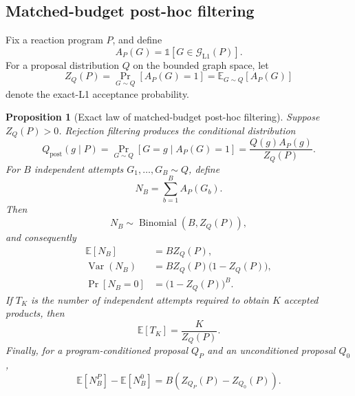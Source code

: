 \documentclass{article}
\newtheorem{proposition}[theorem]{Proposition}
\begin{document}
\subsection{Matched-budget post-hoc filtering}

Fix a reaction program $P$, and define
\begin{equation}
    A_P(G)
    =
    \mathbb{1}\!\left[
        G\in\mathcal{G}_{\mathrm{L1}}(P)
    \right].
\end{equation}
For a proposal distribution $Q$ on the bounded graph space, let
\begin{equation}
    Z_Q(P)
    =
    \Pr_{G\sim Q}[A_P(G)=1]
    =
    \mathbb{E}_{G\sim Q}\!\left[A_P(G)\right]
\end{equation}
denote the exact-L1 acceptance probability.

\begin{proposition}[Exact law of matched-budget post-hoc filtering]
\label{prop:posthoc-budget}
Suppose $Z_Q(P)>0$.
Rejection filtering produces the conditional distribution
\begin{equation}
    Q_{\mathrm{post}}(g\mid P)
    =
    \Pr_{G\sim Q}[G=g\mid A_P(G)=1]
    =
    \frac{Q(g)A_P(g)}{Z_Q(P)}.
\end{equation}
For $B$ independent attempts $G_1,\ldots,G_B\sim Q$, define
\begin{equation}
    N_B
    =
    \sum_{b=1}^{B}A_P(G_b).
\end{equation}
Then
\begin{equation}
    N_B
    \sim
    \operatorname{Binomial}(B,Z_Q(P)),
\end{equation}
and consequently
\begin{align}
    \mathbb E[N_B]
    &=BZ_Q(P),\\
    \operatorname{Var}(N_B)
    &=BZ_Q(P)\bigl(1-Z_Q(P)\bigr),\\
    \Pr[N_B=0]
    &=\bigl(1-Z_Q(P)\bigr)^B.
\end{align}
If $T_K$ is the number of independent attempts required to obtain $K$ accepted products, then
\begin{equation}
    \mathbb E[T_K]
    =
    \frac{K}{Z_Q(P)}.
\end{equation}
Finally, for a program-conditioned proposal $Q_P$ and an unconditioned proposal $Q_0$,
\begin{equation}
    \mathbb E[N_B^{P}]
    -
    \mathbb E[N_B^{0}]
    =
    B\left(
        Z_{Q_P}(P)-Z_{Q_0}(P)
    \right).
\end{equation}
\end{proposition}
\end{document}
